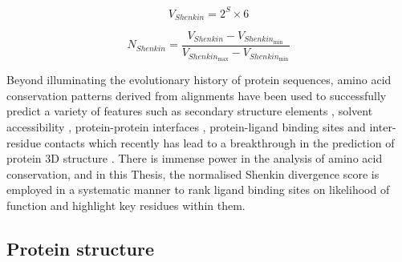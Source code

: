 \begin{equation}
V_{Shenkin} = 2^S \times 6
\label{eq:shenkin}
\end{equation}

\begin{equation}
N_{Shenkin} = \frac{V_{Shenkin} - V_{Shenkin_{\text{min}}}}{V_{Shenkin_{\text{max}}} - V_{Shenkin_{\text{min}}}}
\label{eq:shenkin_norm}
\end{equation}

Beyond illuminating the evolutionary history of protein sequences, amino acid conservation patterns derived from alignments have been used to successfully predict a variety of features such as secondary structure elements \cite{ROST_1993_SSPRED}, solvent accessibility \cite{ROST_1994_RSAPRED}, protein-protein interfaces \cite{LICHTARGE_1996_PPIs}, protein-ligand binding sites \cite{GLASER_2006_PREDICTION} and inter-residue contacts \cite{MARKS_2011_CONS} which recently has lead to a breakthrough in the prediction of protein 3D structure \cite{JUMPER_2021_ALPHAFOLD}. There is immense power in the analysis of amino acid conservation, and in this Thesis, the normalised Shenkin divergence score is employed in a systematic manner to rank ligand binding sites on likelihood of function and highlight key residues within them. 

\subsection{Protein structure}

